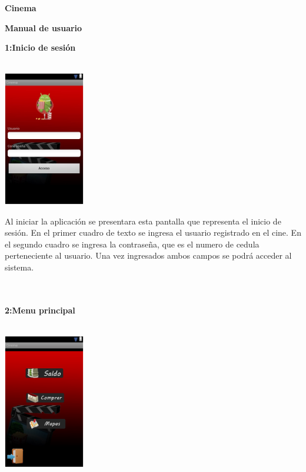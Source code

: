 \documentclass[20pt]{article}
\begin{document}
\begin{center}
	\begin{huge}
		\textbf{Cinema}\\
	\end{huge}
\end{center}

\begin{center}
	\begin{huge}
		\textbf{Manual de usuario}\\ 
	\end{huge}
\end{center}



\begin{large}
	\textbf{1:Inicio de sesión}\\\\
\end{large}

\begin{center}
	\includegraphics[totalheight=1.8in,width=1.4in]{inicio}\\
\end{center}
Al iniciar la aplicación se presentara esta pantalla que representa el inicio de sesión. En el primer cuadro de texto se ingresa el usuario registrado en el cine. En el segundo cuadro se ingresa la contraseña, que es el numero de cedula perteneciente al usuario. Una vez ingresados ambos campos se podrá acceder al sistema.\\\\\



\begin{large}
	\textbf{2:Menu principal}\\\\
\end{large}
\begin{center}
	\includegraphics[totalheight=1.8in,width=1.4in]{menu_principal}\\
\end{center}
\end{document}
